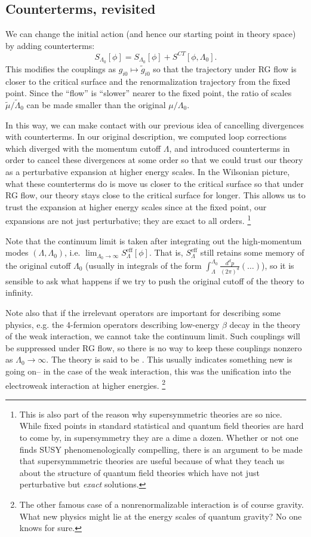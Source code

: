 \subsection*{Counterterms, revisited}
We can change the initial action (and hence our starting point in theory space) by adding counterterms:
\begin{equation}
    S_{\Lambda_0}[\phi] = S_{\Lambda_0}[\phi] +S^{CT}[\phi,\Lambda_0].
\end{equation}
This modifies the couplings as $g_{i0}\mapsto \tilde g_{i0}$ so that the trajectory under RG flow is closer to the critical surface and the renormalization trajectory from the fixed point. Since the ``flow'' is ``slower'' nearer to the fixed point, the ratio of scales $\tilde \mu/\tilde \Lambda_0$ can be made smaller than the original $\mu/\Lambda_0$. 

In this way, we can make contact with our previous idea of cancelling divergences with counterterms. In our original description, we computed loop corrections which diverged with the momentum cutoff $\Lambda$, and introduced counterterms in order to cancel these divergences at some order so that we could trust our theory as a perturbative expansion at higher energy scales. In the Wilsonian picture, what these counterterms do is move us closer to the critical surface so that under RG flow, our theory stays close to the critical surface for longer. This allows us to trust the expansion at higher energy scales since at the fixed point, our expansions are not just perturbative; they are exact to all orders.%
    \footnote{This is also part of the reason why supersymmetric theories are so nice. While fixed points in standard statistical and quantum field theories are hard to come by, in supersymmetry they are a dime a dozen. Whether or not one finds SUSY phenomenologically compelling, there is an argument to be made that supersymmmetric theories are useful because of what they teach us about the structure of quantum field theories which have not just perturbative but \emph{exact} solutions.}

Note that the continuum limit is taken after integrating out the high-momentum modes $(\Lambda,\Lambda_0)$, i.e. $\lim_{\Lambda_0\to\infty} S_\Lambda^\text{eff}[\phi]$. That is, $S_\Lambda^\text{eff}$ still retains some memory of the original cutoff $\Lambda_0$ (usually in integrals of the form $\int_\Lambda^{\Lambda_0} \frac{d^dp}{(2\pi)^d}(\ldots)$), so it is sensible to ask what happens if we try to push the original cutoff of the theory to infinity.

Note also that if the irrelevant operators are important for describing some physics, e.g. the 4-fermion operators describing low-energy $\beta$ decay in the theory of the weak interaction, we cannot take the continuum limit. Such couplings will be suppressed under RG flow, so there is no way to keep these couplings nonzero as $\Lambda_0\to \infty$. The theory is said to be .
This usually indicates something new is going on-- in the case of the weak interaction, this was the unification into the electroweak interaction at higher energies.%
    \footnote{The other famous case of a nonrenormalizable interaction is of course gravity. What new physics might lie at the energy scales of quantum gravity? No one knows for sure.}